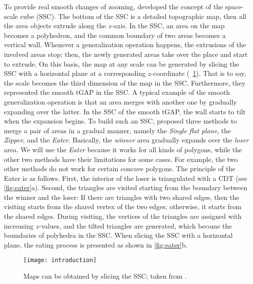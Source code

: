 \documentclass[twocolumn]{svjour3}          %
\begin{document}
To provide real smooth changes of zooming, \citet{vanOosterom2014Support}
developed the concept of the space-scale cube (SSC).
The bottom of the SSC is a detailed topographic map,
then all the area objects extrude along the $z$-axis.
In the SSC, an area on the map becomes a polyhedron, and
the common boundary of two areas becomes a vertical wall.
Whenever a generalization operation happens, 
the extrusions of the involved areas stop;
then, the newly generated areas take over the place and start to extrude.
On this basis, the map at any scale can be generated by slicing the SSC 
with a horizontal plane at a corresponding $z$-coordinate 
(\eg~\fig\ref{fig:slicing}).
That is to say, the scale becomes the third dimension of the map in the SSC.
Furthermore, they represented the smooth tGAP in the SSC.
A typical example of the smooth generalization operation is that 
an area merges with another one by gradually expanding over the latter.
In the SSC of the smooth tGAP, 
the wall starts to tilt when the expansion begins.
To build such an SSC, \citet{Suba2014Merge} proposed three methods 
to merge a pair of areas in a gradual manner, 
namely the \emph{Single flat plane}, 
the \emph{Zipper}, and the \emph{Eater}.
Basically, the \emph{winner} area gradually expands over the \emph{loser} area.
We will use the \emph{Eater} because it works for all kinds of polygons,
while the other two methods have their limitations for some cases.
For example, the two other methods do not work for certain concave polygons.
The principle of the Eater is as follows.
First, the interior of the loser is triangulated with a CDT
(see \fig\ref{fig:eater}a).
Second, the triangles are visited starting from the boundary
between the winner and the loser:
If there are triangles with two shared edges, 
then the visiting starts from the shared vertex of the two edges;
otherwise, it starts from the shared edges.
During visiting, the vertices of the triangles 
are assigned with increasing $z$-values,
and the tilted triangles are generated,
which become the boundaries of polyhedra in the SSC.
When slicing the SSC with a horizontal plane,
the eating process is presented as shown in \fig\ref{fig:eater}b.




\begin{figure}[tb]
\centering
\texttt{[image: introduction]}
\caption{Maps can be obtained by slicing the SSC;
taken from \citet{Meijers2020Web}.}
\label{fig:slicing}
\end{figure}
\end{document}
